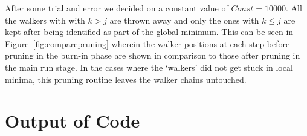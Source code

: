 \documentclass[useAMS,usenatbib]{mn2e}
\begin{document}
After some trial and error we decided on a constant value of $Const = 10000$. All the walkers with with $k>j$ are thrown away and only the ones with $k \leq j$ are kept after being identified as part of the global minimum. This can be seen in Figure~\ref{fig:comparepruning} wherein the walker positions at each step before pruning in the burn-in phase are shown in comparison to those after pruning in the main run stage. In the cases where the `walkers' did not get stuck in local minima, this pruning routine leaves the walker chains untouched. 



\section{Output of Code}\label{sec:output}


\end{document}
